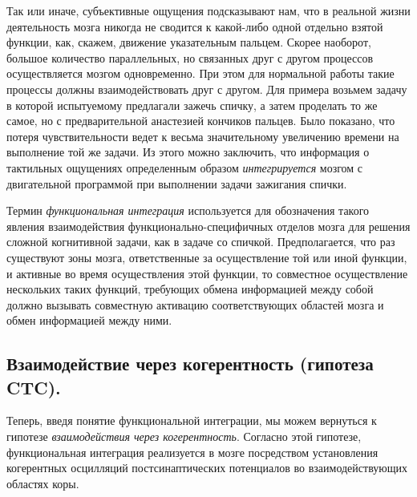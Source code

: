 Так или иначе, субъективные ощущения подсказывают нам, что в реальной жизни
деятельность мозга никогда не сводится к какой-либо одной отдельно взятой
функции, как, скажем, движение указательным пальцем.  Скорее наоборот, большое
количество параллельных, но связанных друг с другом процессов осуществляется
мозгом одновременно. При этом для нормальной работы такие процессы должны
взаимодействовать друг с другом.  Для примера возьмем задачу в которой
испытуемому предлагали зажечь спичку, а затем проделать то же самое, но с
предварительной анастезией кончиков пальцев. Было показано, что потеря
чувствительности ведет к весьма значительному увеличению времени на выполнение
той же задачи.  Из этого можно заключить, что информация о тактильных ощущениях
определенным образом \emph{интегрируется} мозгом с двигательной программой при
выполнении задачи зажигания спички.

Термин \emph{функциональная интеграция} используется для обозначения такого
явления взаимодействия функционально-специфичных отделов мозга для решения
сложной когнитивной задачи, как в задаче со спичкой.  Предполагается, что раз
существуют зоны мозга, ответственные за осуществление той или иной функции, и
активные во время осуществления этой функции, то совместное осуществление
нескольких таких функций, требующих обмена информацией между собой должно
вызывать совместную активацию соответствующих областей мозга и обмен
информацией между ними.

\subsection{Взаимодействие через когерентность (гипотеза CTC).}

Теперь, введя понятие функциональной интеграции, мы можем вернуться к гипотезе
\emph{взаимодействия через когерентность}. Согласно этой гипотезе,
функциональная интеграция реализуется в мозге посредством установления
когерентных осцилляций постсинаптических потенциалов во взаимодействующих
областях коры.


